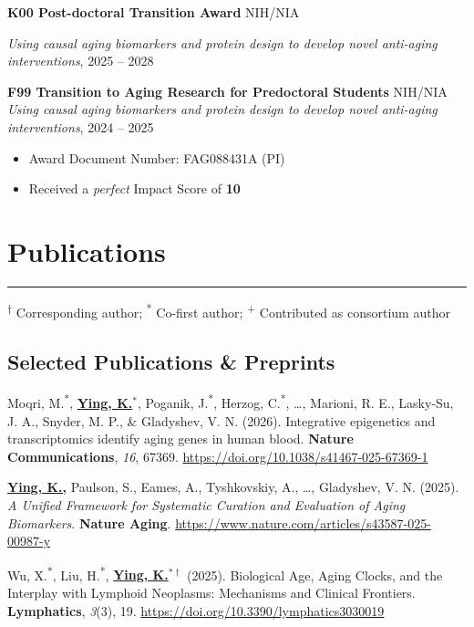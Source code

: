 \documentclass[
  11pt,
]
{article}
\providecommand{\tightlist}{%
  \setlength{\itemsep}{0pt}\setlength{\parskip}{0pt}}
\begin{document}
\textbf{K00 Post-doctoral Transition Award} \hfill NIH/NIA

\emph{Using causal aging biomarkers and protein design to develop novel
anti-aging interventions}, \hfill 2025 -- 2028

\textbf{F99 Transition to Aging Research for Predoctoral Students}
\hfill NIH/NIA \emph{Using causal aging biomarkers and protein design to
develop novel anti-aging interventions}, \hfill 2024 -- 2025

\begin{itemize}
\tightlist
\item
  Award Document Number: FAG088431A (PI)
\item
  Received a \emph{perfect} Impact Score of \textbf{10}
\end{itemize}

\section{Publications}\label{publications}

\hrule

\textsuperscript{†} Corresponding author; \textsuperscript{*} Co-first
author; \textsuperscript{+} Contributed as consortium author

\subsection{Selected Publications \&
Preprints}\label{selected-publications-preprints}

Moqri, M.\textsuperscript{*}, \textbf{\underline{Ying, K.$^{*}$}},
Poganik, J.\textsuperscript{*}, Herzog, C.\textsuperscript{*}, \ldots,
Marioni, R. E., Lasky-Su, J. A., Snyder, M. P., \& Gladyshev, V. N.
(2026). Integrative epigenetics and transcriptomics identify aging genes
in human blood. \textbf{Nature Communications}, \emph{16}, 67369.
\url{https://doi.org/10.1038/s41467-025-67369-1}

\textbf{\underline{Ying, K.,}} Paulson, S., Eames, A., Tyshkovskiy, A.,
\ldots, Gladyshev, V. N. (2025). \emph{A Unified Framework for
Systematic Curation and Evaluation of Aging Biomarkers}. \textbf{Nature
Aging}. \url{https://www.nature.com/articles/s43587-025-00987-y}

Wu, X.\textsuperscript{*}, Liu, H.\textsuperscript{*},
\textbf{\underline{Ying, K.$^{*\dagger}$}} (2025). Biological Age, Aging
Clocks, and the Interplay with Lymphoid Neoplasms: Mechanisms and
Clinical Frontiers. \textbf{Lymphatics}, \emph{3}(3), 19.
\url{https://doi.org/10.3390/lymphatics3030019}
\end{document}
